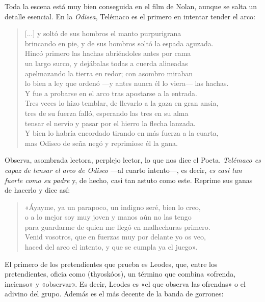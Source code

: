 Toda la escena está muy bien conseguida en el film de Nolan, aunque se salta un detalle esencial.  En la \emph{Odisea}, Telémaco es el primero en intentar tender el arco:

\begin{verse}
[...] y soltó de sus hombros el manto purpurigrana\\
brincando en pie, y de sus hombros soltó la espada aguzada.\\
Hincó primero las hachas abriéndoles antes por cama\\
un largo surco, y dejábalas todas a cuerda alineadas\\
apelmazando la tierra en redor; con asombro miraban\\
lo bien a ley que ordenó ---y antes nunca él lo viera--- las hachas.\\
Y fue a probarse en el arco tras apostarse a la entrada.\\
Tres veces lo hizo temblar, de llevarlo a la gaza en gran ansia,\\
tres de su fuerza falló, esperando las tres en su alma\\
tensar el nervio y pasar por el hierro la flecha lanzada.\\
Y bien lo habría encordado tirando en más fuerza a la cuarta,\\
mas Odiseo de seña negó y reprimiose él la gana.
\end{verse}

Observa, asombrada lectora, perplejo lector, lo que nos dice el Poeta. \emph{Telémaco es capaz de tensar el arco de Odiseo} ---al cuarto intento---, es decir, \emph{es casi tan fuerte como su padre} y, de hecho, casi tan astuto como este. Reprime sus ganas de hacerlo y dice así:

\begin{verse}
«Áyayme, ya un parapoco, un indigno seré, bien lo creo,\\
o a lo mejor soy muy joven y manos aún no las tengo\\
para guardarme de quien me llegó en malhechuras primero.\\
Venid vosotros, que en fuerzas muy por delante yo os veo,\\
haced del arco el intento, y que se cumpla ya el juego».
\end{verse}

El primero de los pretendientes que prueba es Leodes, que, entre los pretendientes, oficia como  (thyoskóos), un término que combina  «ofrenda, incienso» y  «observar». Es decir, Leodes es «el que observa las ofrendas» o el adivino del grupo. Además es el más decente de la banda de gorrones:

